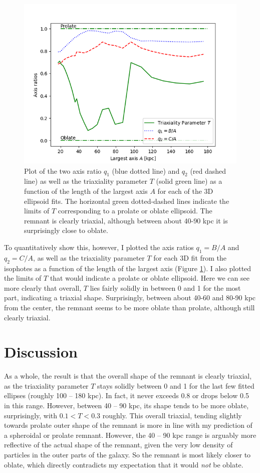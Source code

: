 \documentclass[twocolumn]{aastex631}
\begin{document}
\begin{figure}
    \centering
    \includegraphics[width=1.1\linewidth]{axis_ratios.png}
    \caption{Plot of the two axis ratio $q_1$ (blue dotted line) and $q_2$ (red dashed line) as well as the triaxiality parameter $T$ (solid green line) as a function of the length of the largest axis $A$ for each of the 3D ellipsoid fits. The horizontal green dotted-dashed lines indicate the limits of $T$ corresponding to a prolate or oblate ellipsoid. The remnant is clearly  triaxial, although between about 40-90 kpc it is surprisingly close to oblate.}
    \label{fig:axis_ratios}
\end{figure}
To quantitatively show this, however, I plotted the axis ratios $q_1 = B/A$ and $q_2 = C/A$, as well as the triaxiality parameter $T$ \citep{Quenneville+2022} for each 3D fit from the isophotes as a function of the length of the largest axis (Figure \ref{fig:axis_ratios}). 
I also plotted the limits of $T$ that would indicate a prolate or oblate ellipsoid.
Here we can see more clearly that overall, $T$ lies fairly solidly in between 0 and 1 for the most part, indicating a triaxial shape.
Surprisingly, between about 40-60 and 80-90 kpc from the center, the remnant seems to be more oblate than prolate, although still clearly triaxial.


\section{Discussion}

As a whole, the result is that the overall shape of the remnant is clearly triaxial, as the triaxiality parameter $T$ stays solidly between 0 and 1 for the last few fitted ellipses (roughly 100 -- 180 kpc).
In fact, it never exceeds 0.8 or drops below 0.5 in this range. However, between 40 -- 90 kpc, its shape tends to be more oblate, surprisingly, with $0.1 < T < 0.3$ roughly. 
This overall triaxial, tending slightly towards prolate outer shape of the remnant is more in line with my prediction of a spheroidal or prolate remnant.
However, the 40 -- 90 kpc range is arguably more reflective of the actual shape of the remnant, given the very low density of particles in the outer parts of the galaxy.
So the remnant is most likely closer to oblate, which directly contradicts my expectation that it would \textit{not} be oblate.
\end{document}

